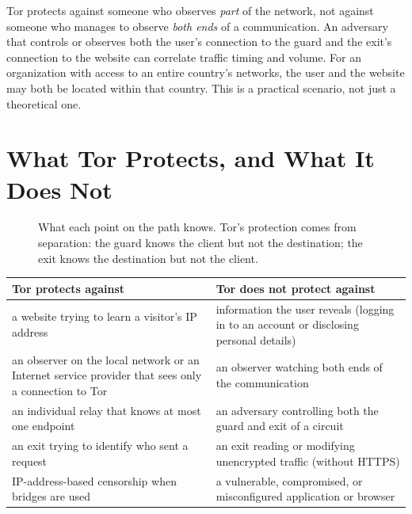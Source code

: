 \begin{attenzione}
Tor protects against someone who observes \emph{part} of the network, not against someone who manages to observe \emph{both ends} of a communication. An adversary that controls or observes both the user's connection to the guard and the exit's connection to the website can correlate traffic timing and volume. For an organization with access to an entire country's networks, the user and the website may both be located within that country. This is a practical scenario, not just a theoretical one.
\end{attenzione}

\section{What Tor Protects, and What It Does Not}\label{sec:minaccia-sintesi}

\begin{figure}[htbp]
\centering

\caption{What each point on the path knows. Tor's protection comes from separation: the guard knows the client but not the destination; the exit knows the destination but not the client.}
\label{fig:sapere}
\end{figure}

\begin{center}\small
\begin{tabularx}{\textwidth}{@{}>{\raggedright\arraybackslash}X>{\raggedright\arraybackslash}X@{}}
\toprule
Tor protects against & Tor does not protect against \\
\midrule
a website trying to learn a visitor's IP address & information the user reveals (logging in to an account or disclosing personal details) \\
an observer on the local network or an Internet service provider that sees only a connection to Tor & an observer watching both ends of the communication \\
an individual relay that knows at most one endpoint & an adversary controlling both the guard and exit of a circuit \\
an exit trying to identify who sent a request & an exit reading or modifying unencrypted traffic (without HTTPS) \\
IP-address-based censorship when bridges are used & a vulnerable, compromised, or misconfigured application or browser \\
\bottomrule
\end{tabularx}
\end{center}

